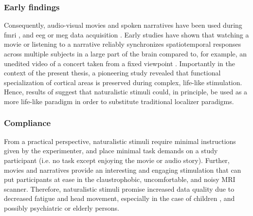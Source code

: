 \subsubsection{Early findings}
Consequently, audio-visual movies and spoken narratives have been used during
\ac{fmri} \citep[cf.][for reviews]{hamilton2018revolution,
hasson2008neurocinematics, sonkusare2019naturalistic,
saarimaki2021naturalistic}, and \ac{eeg} or \ac{meg} data acquisition
\citep[s.][for reviews]{alday2019meg, kandylaki2019story}.
Early studies have shown that watching a movie \citep{hasson2004intersubject,
hasson2008neurocinematics, hasson2010reliability} or listening to a narrative
\citep{lerner2011topographic, wilson2008beyond} reliably synchronizes
spatiotemporal responses across multiple subjects in a large part of the brain
compared to, for example, an unedited video of a concert taken from a fixed
viewpoint \citep{hasson2004intersubject, hasson2008neurocinematics,
hasson2010reliability, lerner2011topographic, wilson2008beyond}.
Importantly in the context of the present thesis, a pioneering study
\citep{bartels2004mapping} revealed that functional specialization of cortical
areas is preserved during complex, life-like stimulation.
Hence, results of \citet{bartels2004mapping} suggest that naturalistic stimuli
could, in principle, be used as a more life-like paradigm in order to substitute
traditional localizer paradigms.


\subsubsection{Compliance}

From a practical perspective, naturalistic stimuli require minimal instructions
given by the experimenter, and place minimal task demands on a study participant
(i.e.  no task except enjoying the movie or audio story).
%
Further, movies and narratives provide an interesting and engaging stimulation
that can put participants at ease in the claustrophobic, uncomfortable, and
noisy MRI scanner.
%
Therefore, naturalistic stimuli promise increased data quality due to decreased
fatigue and head movement, especially in the case of children
\citep{vanderwal2015inscapes}, and possibly psychiatric
\citep{eickhoff2020towards} or elderly persons.


